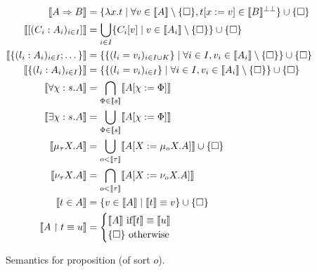 \begin{figure}
  \begin{align*}
    \llbracket A \Rightarrow B \rrbracket &=
      \{\lambda x.t \;|\; \forall v \in \llbracket A \rrbracket \setminus
      \{\square\},
      t[x := v] \in \llbracket B \rrbracket^{\bot\bot}\} \cup \{\square\}\\
    \llbracket [(C_i : A_i)_{i \in I}] \rrbracket
      &= \bigcup_{i \in I} \{C_i[v] \;|\; v \in \llbracket A_i \rrbracket
           \setminus \{\square\}\} \cup \{\square\}\\
    \llbracket \{(l_i : A_i)_{i \in I}; \dots\} \rrbracket
      &= \{\{(l_i = v_i)_{i \in I \cup K}\} \;|\; \forall i \in I, v_i \in \llbracket A_i \rrbracket
           \setminus \{\square\}\} \cup \{\square\}\\
    \llbracket \{(l_i : A_i)_{i \in I}\} \rrbracket
      &= \{\{(l_i = v_i)_{i \in I}\} \;|\; \forall i \in I, v_i \in
    \llbracket A_i \rrbracket
           \setminus \{\square\}\} \cup \{\square\}\\
    \llbracket \forall \chi:s.A \rrbracket
      &= \bigcap_{\Phi \in \llbracket s \rrbracket}
           \llbracket A[\chi := \Phi] \rrbracket\\
    \llbracket \exists \chi:s.A \rrbracket
      &= \bigcup_{\Phi \in \llbracket s \rrbracket}
           \llbracket A[\chi := \Phi] \rrbracket\\
    \llbracket \mu_\tau X.A \rrbracket
      &= \bigcup_{o < \llbracket \tau \rrbracket}
            \llbracket A[X := \mu_o X.A] \rrbracket \cup \{\square\}\\
    \llbracket \nu_\tau X.A \rrbracket
      &= \bigcap_{o < \llbracket \tau \rrbracket}
            \llbracket A[X := \nu_o X.A] \rrbracket\\
    \llbracket t \in A \rrbracket
      &= \{v \in \llbracket A \rrbracket \;|\; \llbracket t \rrbracket
      \equiv v\} \cup \{\square\}\\
    \llbracket A \restriction t \equiv u \rrbracket
      &= \begin{cases}
           \llbracket A \rrbracket \text{ if} \llbracket t \rrbracket
             \equiv \llbracket u \rrbracket\\
           \{\square\} \text{ otherwise}
         \end{cases}
  \end{align*}
  \caption{Semantics for proposition (of sort $o$).}\label{semomicron}
\end{figure}

